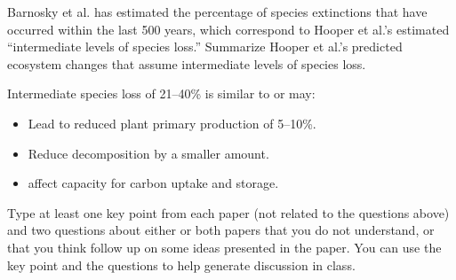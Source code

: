 \documentclass[12pt, addpoints]{exam}
\begin{document}
\begin{questions}
\ifprintanswers
	\newpage
\fi

\question[10]
Barnosky et al. has estimated the percentage of species extinctions
  that have occurred within the last 500 years, which correspond to
  Hooper et al.'s estimated ``intermediate levels of species loss.''
  Summarize Hooper et al.'s predicted ecosystem changes that assume
  intermediate levels of species loss.

\ifprintanswers
\begin{solution}
Intermediate species loss of 21--40\% is similar to or may:

\begin{itemize}
	\item Lead to reduced plant primary production of 5--10\%.

	\item Reduce decomposition by a smaller amount.

	\item affect capacity for carbon uptake and storage.
\end{itemize}
\end{solution}
\else
\fi

\question[5]
Type at least one key point from each paper (not related to the
  questions above) and two questions about either or both papers that
  you do not understand, or that you think follow up on some ideas
  presented in the paper. You can use the key point and the questions to
  help generate discussion in class. 


\end{questions}
\end{document}
